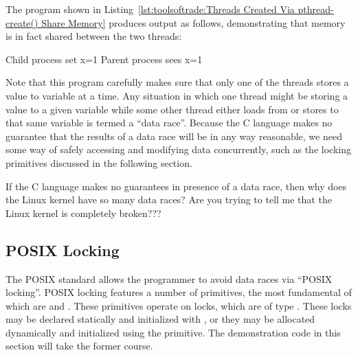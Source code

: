 The program shown in
Listing~\ref{lst:toolsoftrade:Threads Created Via pthread-create() Share Memory}
produces output as follows, demonstrating that memory is in fact
shared between the two threads:

\begin{VerbatimU}
Child process set x=1
Parent process sees x=1
\end{VerbatimU}

Note that this program carefully makes sure that only one of the threads
stores a value to variable  at a time.
Any situation in which one thread might be storing a value to a given
variable while some other thread either loads from or stores to that
same variable is termed a ``data race''.
Because the C language makes no guarantee that the results of a data race
will be in any way reasonable, we need some way of safely accessing
and modifying data concurrently, such as the locking primitives discussed
in the following section.

\QuickQuiz{}
	If the C language makes no guarantees in presence of a data
	race, then why does the Linux kernel have so many data races?
	Are you trying to tell me that the Linux kernel is completely
	broken???
 \QuickQuizEnd

\subsection{POSIX Locking}
\label{sec:toolsoftrade:POSIX Locking}

The POSIX standard allows the programmer to avoid data races via
``POSIX locking''.
POSIX locking features a number of primitives, the most fundamental
of which are  and .
These primitives operate on locks, which are of type .
These locks may be declared statically and initialized with
, or they may be allocated dynamically
and initialized using the  primitive.
The demonstration code in this section will take the former course.

